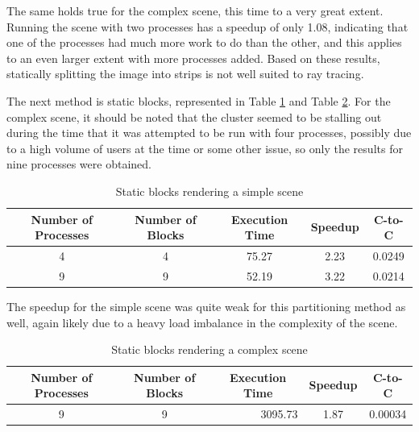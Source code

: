 \documentclass[CMPE]{KGCOEReport}
\begin{document}
\vspace*{1mm}

The same holds true for the complex scene, this time to a very great extent. Running 
the scene with two processes has a speedup of only 1.08, indicating that one of the 
processes had much more work to do than the other, and this applies to an even larger 
extent with more processes added. Based on these results, statically splitting the 
image into strips is not well suited to ray tracing.

The next method is static blocks, represented in Table \ref{tab:static-blocks-simple} 
and Table \ref{tab:static-blocks-complex}. For the complex scene, it should be noted 
that the cluster seemed to be stalling out during the time that it was attempted to 
be run with four processes, possibly due to a high volume of users at the time or 
some other issue, so only the results for nine processes were obtained.

\begin{table}[h]
\centering
\caption{Static blocks rendering a simple scene}
\label{tab:static-blocks-simple}
\begin{tabular}{ccccc}
\hline
Number of Processes & Number of Blocks & Execution Time & Speedup & C-to-C \\ \hline
4                   & 4                & 75.27          & 2.23    & 0.0249 \\
9                   & 9                & 52.19          & 3.22    & 0.0214
\end{tabular}
\end{table}

\vspace*{1mm}

The speedup for the simple scene was quite weak for this partitioning method as well, 
again likely due to a heavy load imbalance in the complexity of the scene. \\

\vspace*{1mm}

\begin{table}[h]
\centering
\caption{Static blocks rendering a complex scene}
\label{tab:static-blocks-complex}
\begin{tabular}{ccccc}
\hline
Number of Processes & Number of Blocks & Execution Time              & \multicolumn{1}{c}{Speedup} & \multicolumn{1}{c}{C-to-C} \\ \hline
9                   & 9                & \multicolumn{1}{r}{3095.73} & 1.87                        & 0.00034                   
\end{tabular}
\end{table}
\end{document}
